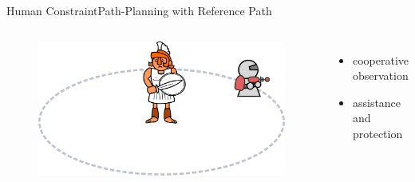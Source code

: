 \begin{frame}{Human Constraint}{Path-Planning with Reference Path}

\begin{columns}
\begin{figure}
\centering
\includegraphics[width = \textwidth]{./figure/human_robot_interaction}
\end{figure}

\begin{itemize}
\item cooperative observation
\item assistance and protection
\end{itemize}


\end{columns}
\end{frame}
